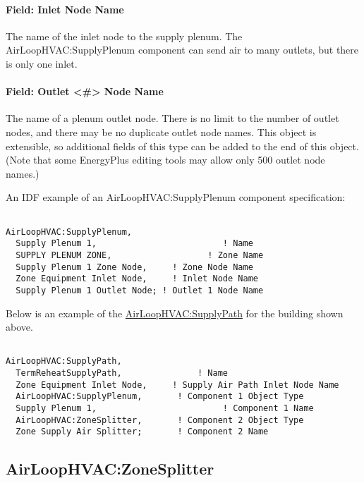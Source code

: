 \paragraph{Field: Inlet Node Name}\label{field-inlet-node-name-1}

The name of the inlet node to the supply plenum. The AirLoopHVAC:SupplyPlenum component can send air to many outlets, but there is only one inlet.

\paragraph{Field: Outlet \textless{}\#\textgreater{} Node Name}\label{field-outlet-node-name-1-000}

The name of a plenum outlet node. There is no limit to the number of outlet nodes, and there may be no duplicate outlet node names.  This object is extensible, so additional fields of this type can be added to the end of this object. (Note that some EnergyPlus editing tools may allow only 500 outlet node names.)

An IDF example of an AirLoopHVAC:SupplyPlenum component specification:

\begin{lstlisting}

AirLoopHVAC:SupplyPlenum,
  Supply Plenum 1,                         ! Name
  SUPPLY PLENUM ZONE,                   ! Zone Name
  Supply Plenum 1 Zone Node,     ! Zone Node Name
  Zone Equipment Inlet Node,     ! Inlet Node Name
  Supply Plenum 1 Outlet Node; ! Outlet 1 Node Name
\end{lstlisting}

Below is an example of the \hyperref[airloophvacsupplypath]{AirLoopHVAC:SupplyPath} for the building shown above.

\begin{lstlisting}

AirLoopHVAC:SupplyPath,
  TermReheatSupplyPath,               ! Name
  Zone Equipment Inlet Node,     ! Supply Air Path Inlet Node Name
  AirLoopHVAC:SupplyPlenum,       ! Component 1 Object Type
  Supply Plenum 1,                         ! Component 1 Name
  AirLoopHVAC:ZoneSplitter,       ! Component 2 Object Type
  Zone Supply Air Splitter;       ! Component 2 Name
\end{lstlisting}

\subsection{AirLoopHVAC:ZoneSplitter}\label{airloophvaczonesplitter}

